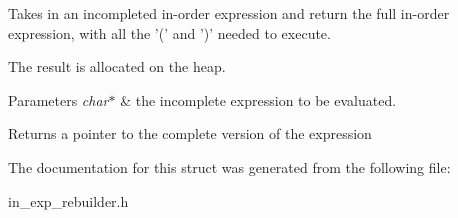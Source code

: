 Takes in an incompleted in-\/order expression and return the full in-\/order expression, with all the '(' and ')' needed to execute. 

The result is allocated on the heap. 
\begin{DoxyParams}{Parameters}
{\em char$\ast$} & the incomplete expression to be evaluated. \\
\hline
\end{DoxyParams}
\begin{DoxyReturn}{Returns}
a pointer to the complete version of the expression 
\end{DoxyReturn}


The documentation for this struct was generated from the following file\-:\begin{DoxyCompactItemize}
\item 
in\-\_\-exp\-\_\-rebuilder.\-h\end{DoxyCompactItemize}
